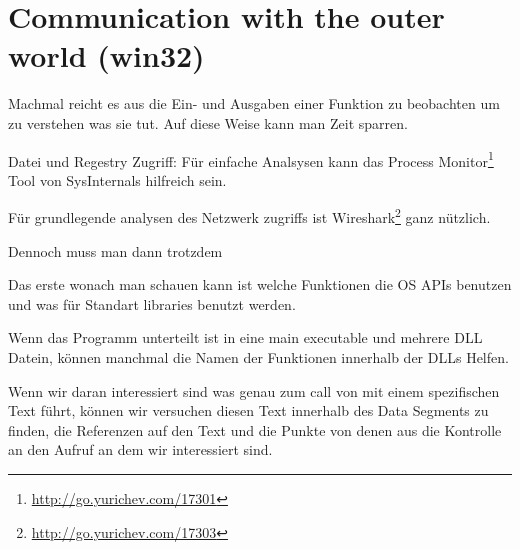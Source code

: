 \section{Communication with the outer world (win32)}

Machmal reicht es aus die Ein- und Ausgaben einer Funktion zu beobachten um zu verstehen was sie tut.
Auf diese Weise kann man Zeit sparren.

Datei und Regestry Zugriff:
Für einfache Analsysen kann das Process Monitor\footnote{\url{http://go.yurichev.com/17301}}
Tool von SysInternals hilfreich sein.


Für grundlegende analysen des Netzwerk zugriffs ist Wireshark\footnote{\url{http://go.yurichev.com/17303}} ganz nützlich.

Dennoch muss man dann trotzdem %

Das erste wonach man schauen kann ist welche Funktionen die \ac{OS} \ac{API}s benutzen und was für Standart libraries
benutzt werden. 

Wenn das Programm unterteilt ist in eine main executable und mehrere DLL Datein, können manchmal die Namen der Funktionen innerhalb
der DLLs Helfen. 


% 

Wenn wir daran interessiert sind was genau zum call von  mit einem spezifischen Text führt,
können wir versuchen diesen Text innerhalb des Data Segments zu finden, die Referenzen auf den Text und die 
Punkte von denen aus die Kontrolle an den  Aufruf an dem wir interessiert sind.

